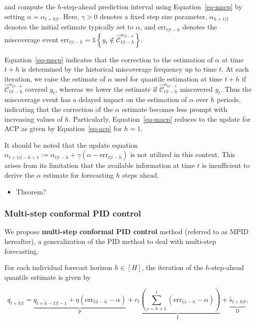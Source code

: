 \documentclass[
  11pt,
  a4paper,
]{article}
\providecommand{\tightlist}{%
  \setlength{\itemsep}{0pt}\setlength{\parskip}{0pt}}\usepackage{longtable,booktabs,array}
\theoremstyle{plain}
\theoremstyle{plain}
\theoremstyle{remark}
\begin{document}
and compute the \(h\)-step-ahead prediction interval using
Equation~\ref{eq-mscp} by setting \(\alpha = \alpha_{t+h|t}\). Here,
\(\gamma > 0\) denotes a fixed step size parameter, \(\alpha_{h+1|1}\)
denotes the initial estimate typically set to \(\alpha\), and
\(\mathrm{err}_{t|t-h}\) denotes the miscoverage event
\(\mathrm{err}_{t|t-h} = \mathbb{1}\left\{y_t \notin \hat{\mathcal{C}}_{t|t-h}^{\alpha_{t|t-h}}\right\}\).

Equation~\ref{eq-mscp} indicates that the correction to the estimation
of \(\alpha\) at time \(t+h\) is determined by the historical
miscoverage frequency up to time \(t\). At each iteration, we raise the
estimate of \(\alpha\) used for quantile estimation at time \(t+h\) if
\(\hat{\mathcal{C}}_{t|t-h}^{\alpha_{t|t-h}}\) covered \(y_t\), whereas
we lower the estimate if \(\hat{\mathcal{C}}_{t|t-h}^{\alpha_{t|t-h}}\)
miscovered \(y_t\). Thus the miscoverage event has a delayed impact on
the estimation of \(\alpha\) over \(h\) periods, indicating that the
correction of the \(\alpha\) estimate becomes less prompt with
increasing values of \(h\). Particularly, Equation~\ref{eq-macp} reduces
to the update for ACP as given by Equation~\ref{eq-acp} for \(h=1\).

It should be noted that the update equation
\(\alpha_{t+1|t-h+1} := \alpha_{t|t-h} + \gamma\left(\alpha - \mathrm{err}_{t|t-h}\right)\)
is not utilized in this context. This arises from its limitation that
the available information at time \(t\) is insufficient to derive the
\(\alpha\) estimate for forecasting \(h\) steps ahead.

\begin{itemize}
\tightlist
\item
  Theorem?
\end{itemize}

\subsubsection{Multi-step conformal PID
control}\label{multi-step-conformal-pid-control}

We propose \textbf{multi-step conformal PID control} method (referred to
as MPID hereafter), a generalization of the PID method to deal with
multi-step forecasting.

For each individual forecast horizon \(h\in[H]\), the iteration of the
\(h\)-step-ahead quantile estimate is given by

\[
q_{t+h|t}=\underbrace{q_{t+h-1|t-1}+\eta \left(\mathrm{err}_{t|t-h}-\alpha\right)}_{\mathrm{P}}+\underbrace{r_t\left(\sum_{i=h+1}^t \left(\mathrm{err}_{i|i-h}-\alpha\right)\right)}_{\mathrm{I}}+\underbrace{\hat{s}_{t+h|t}}_{\mathrm{D}},
\]
\end{document}
